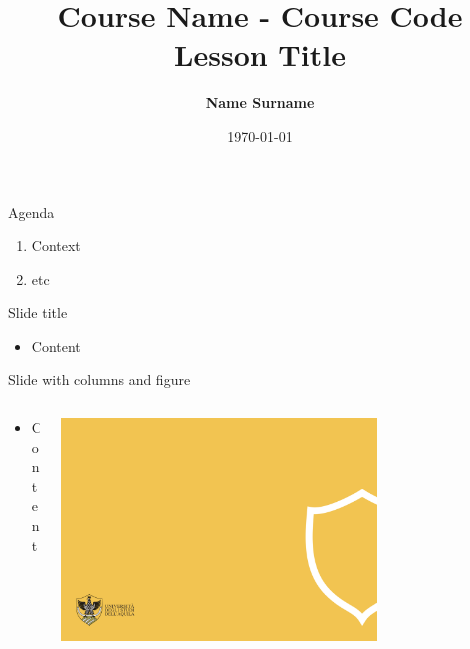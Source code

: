 \documentclass{univaqslides}
\author{\textbf{Name Surname}}
\date{\today}
\title{
	\color{black}
	\huge Course Name - Course Code\\
	\vspace{1cm}
	\textbf{Lesson Title}
	\vspace{1em}
}
\begin{document}
	\univaqtitlepage
	
	\begin{frame}{Agenda}
		\begin{enumerate}
			\item Context
			\item etc
		\end{enumerate}
	\end{frame}
	
	\begin{frame}{Slide title}
	\begin{itemize}
		\item Content
	\end{itemize}
	\end{frame}


	\begin{frame}{Slide with columns and figure}
		\begin{columns}
			\begin{column}{0.5\textwidth}
				\begin{itemize}
					\item Content
				\end{itemize}
			\end{column}
			\begin{column}{0.5\textwidth}
				\includegraphics[width=0.7\textwidth]{logos/back43.png}
			\end{column}
		\end{columns}
	\end{frame}
\end{document}
